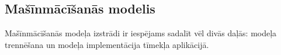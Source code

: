 \subsection{Mašīnmācīšanās modelis}

    Mašīnmācīšanās modeļa izstrādi ir iespējams sadalīt vēl divās daļās: modeļa trennēšana un modeļa
    implementācija tīmekļa aplikācijā.

